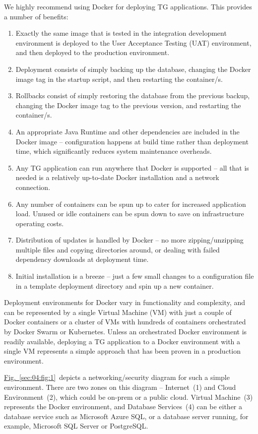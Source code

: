 \documentclass[a4paper,12pt,oneside,openright]{memoir}
\begin{document}
	We highly recommend using Docker for deploying TG applications.
	This provides a number of benefits:
\begin{enumerate}
	\item Exactly the same image that is tested in the integration development environment is deployed to the User Acceptance Testing (UAT) environment, and then deployed to the production environment.
	\item Deployment consists of simply backing up the database, changing the Docker image tag in the startup script, and then restarting the container/s.
	\item Rollbacks consist of simply restoring the database from the previous backup, changing the Docker image tag to the previous version, and restarting the container/s.
	\item An appropriate Java Runtime and other dependencies are included in the Docker image -- configuration happens at build time rather than deployment time, which significantly reduces system maintenance overheads.
	\item Any TG application can run anywhere that Docker is supported -- all that is needed is a relatively up-to-date Docker installation and a network connection.
	\item Any number of containers can be spun up to cater for increased application load.
	      Unused or idle containers can be spun down to save on infrastructure operating costs.
	\item Distribution of updates is handled by Docker -- no more zipping/unzipping multiple files and copying directories around, or dealing with failed dependency downloads at deployment time.
	\item Initial installation is a breeze -- just a few small changes to a configuration file in a template deployment directory and spin up a new container.
\end{enumerate}

	Deployment environments for Docker vary in functionality and complexity, and can be represented by a single Virtual Machine (VM) with just a couple of Docker containers or a cluster of VMs with hundreds of containers orchestrated by Docker Swarm or Kubernetes.
	Unless an orchestrated Docker environment is readily available, deploying a TG application to a Docker environment with a single VM represents a simple approach that has been proven in a production environment.

	\hyperref[sec:04:fig:1]{Fig.~\ref*{sec:04:fig:1}}~depicts a networking/security diagram for such a simple environment.
	There are two zones on this diagram -- Internet~(1) and Cloud Environment~(2), which could be on-prem or a public cloud.
	Virtual Machine~(3) represents the Docker environment, and Database Services~(4) can be either a database service such as Microsoft Azure SQL, or a database server running, for example, Microsoft SQL Server or PostgreSQL.
\end{document}
